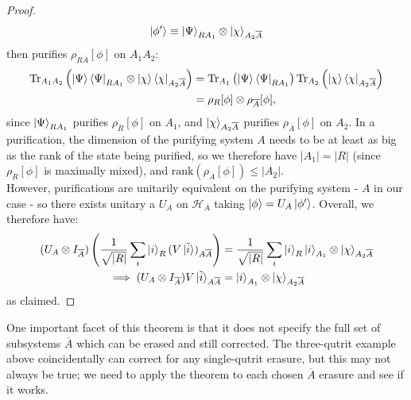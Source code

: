 \documentclass[12pt,a4paper]{report}
\numberwithin{equation}{section}
\newcommand{\ketbra}[2]{\ket{#1}\bra{#2}}
\newcommand{\ketbras}[1]{\ketbra{#1}{#1}}
\newcommand{\ol}[1]{\overline{#1}}
\theoremstyle{definition}
\theoremstyle{theorem}
\theoremstyle{theorem}
\theoremstyle{example}
\theoremstyle{definition}
\begin{document}
\begin{proof}
	\begin{equation}
		\ket{\phi'}\equiv\ket{\Psi}_{RA_{1}}\otimes\ket{\chi}_{A_{2}\overline{A}}
	\end{equation}
	then purifies $\rho_{R\overline{A}}[\phi]$ on $A_{1}A_{2}$:
	\begin{equation}
		\begin{aligned}
			\text{Tr}_{A_{1}A_{2}}\left(\ketbras{\Psi}_{RA_{1}}\otimes\ketbras{\chi}_{A_{2}\overline{A}}\right)&=\text{Tr}_{A_{1}}\left(\ketbras{\Psi}_{RA_{1}}\right)\text{Tr}_{A_{2}}\left(\ketbras{\chi}_{A_{2}\overline{A}}\right)\\&=\rho_{R}[\phi]\otimes\rho_{\overline{A}}[\phi],
		\end{aligned}
	\end{equation}
	since $\ket{\Psi}_{RA_{1}}$ purifies $\rho_{R}[\phi]$ on $A_{1}$, and $\ket{\chi}_{A_{2}\overline{A}}$ purifies $\rho_{\overline{A}}[\phi]$ on $A_{2}$. In a purification, the dimension of the purifying system $A$ needs to be at least as big as the rank of the state being purified, so we therefore have $|A_{1}|=|R|$ (since $\rho_{R}[\phi]$ is maximally mixed), and $\text{rank}\left(\rho_{\overline{A}}[\phi]\right)\leq|A_{2}|$.\\
	However, purifications are unitarily equivalent on the purifying system - $A$ in our case - so there exists unitary a $U_{A}$ on $\mathcal{H}_{A}$ taking $\ket{\phi}=U_{A}\ket{\phi'}$. Overall, we therefore have:
	\begin{equation}
		\begin{aligned}
			(U_{A}\otimes I_{\ol{A}})\left(\frac{1}{\sqrt{|R|}}\sum_{i}\ket{i}_{R}(V\ket{\tilde{i}})_{A\overline{A}}\right)&=\frac{1}{\sqrt{|R|}}\sum_{i}\ket{i}_{R}\ket{i}_{A_{1}}\otimes\ket{\chi}_{A_{2}\overline{A}}\\
			\implies (U_{A}\otimes I_{\ol{A}})V\ket{\tilde{i}}_{A\overline{A}}&=\ket{i}_{A_{1}}\otimes\ket{\chi}_{A_{2}\overline{A}}
		\end{aligned}
	\end{equation}
	as claimed.
\end{proof}
One important facet of this theorem is that it does not specify the full set of subsystems $\ol{A}$ which can be erased and still corrected. The three-qutrit example above coincidentally can correct for any single-qutrit erasure, but this may not always be true; we need to apply the theorem to each chosen $\ol{A}$ erasure and see if it works.
\end{document}
